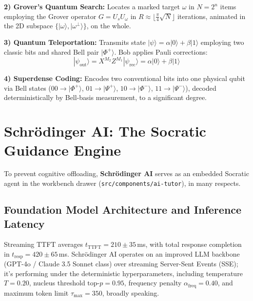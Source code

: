 \documentclass[conference]{IEEEtran}
\begin{document}
\noindent\textbf{2) Grover's Quantum Search:} Locates a marked target $\omega$ in $N=2^n$ items employing the Grover operator $G = U_s U_\omega$ in $R \approx \lfloor \frac{\pi}{4}\sqrt{N} \rfloor$ iterations, animated in the 2D subspace $\{|\omega\rangle, |\omega^\perp\rangle\}$, on the whole.

\noindent\textbf{3) Quantum Teleportation:} Transmits state $|\psi\rangle = \alpha|0\rangle + \beta|1\rangle$ employing two classic bits and shared Bell pair $|\Phi^+\rangle$. Bob applies Pauli corrections:
\begin{equation}
|\psi_{\text{out}}\rangle = X^{M_2} Z^{M_1} |\psi_{\text{rec}}\rangle = \alpha|0\rangle + \beta|1\rangle
\end{equation}

\noindent\textbf{4) Superdense Coding:} Encodes two conventional bits into one physical qubit via Bell states ($00 \to |\Phi^+\rangle$, $01 \to |\Psi^+\rangle$, $10 \to |\Phi^-\rangle$, $11 \to |\Psi^-\rangle$), decoded deterministically by Bell-basis measurement, to a significant degree.

\section{Schr{\"o}dinger AI: The Socratic Guidance Engine}
\label{sec:ai_engine}

To prevent cognitive offloading, \textbf{Schr{\"o}dinger AI} serves as an embedded Socratic agent in the workbench drawer (\texttt{src/components/ai-tutor}), in many respects.

\subsection{Foundation Model Architecture and Inference Latency}
Streaming TTFT averages $t_{\text{TTFT}} = 210 \pm 35$\,ms, with total response completion in $t_{\text{resp}} = 420 \pm 65$\,ms. Schr{\"o}dinger AI operates on an improved LLM backbone (GPT-4o / Claude 3.5 Sonnet class) over streaming Server-Sent Events (SSE); it's performing under the deterministic hyperparameters, including temperature $T = 0.20$, nucleus threshold $\text{top-}p = 0.95$, frequency penalty $\alpha_{\text{freq}} = 0.40$, and maximum token limit $\tau_{\max} = 350$, broadly speaking.
\end{document}
